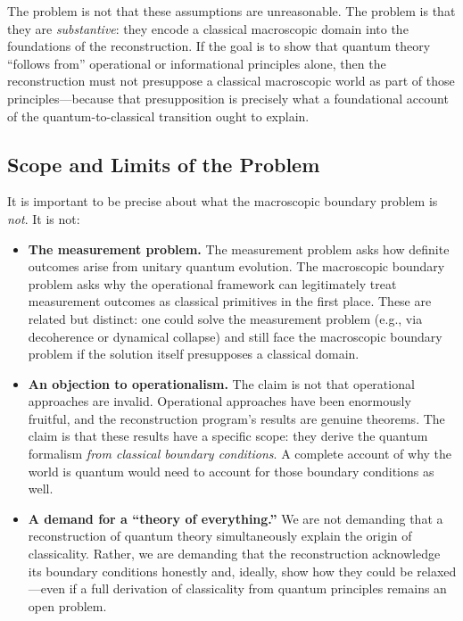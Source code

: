 \documentclass[12pt,a4paper,twoside]{article}
\begin{document}
The problem is not that these assumptions are unreasonable. The problem is that they are \emph{substantive}: they encode a classical macroscopic domain into the foundations of the reconstruction. If the goal is to show that quantum theory ``follows from'' operational or informational principles alone, then the reconstruction must not presuppose a classical macroscopic world as part of those principles---because that presupposition is precisely what a foundational account of the quantum-to-classical transition ought to explain.

\subsection{Scope and Limits of the Problem}

It is important to be precise about what the macroscopic boundary problem is \emph{not}. It is not:

\begin{itemize}
\item \textbf{The measurement problem.} The measurement problem asks how definite outcomes arise from unitary quantum evolution. The macroscopic boundary problem asks why the operational framework can legitimately treat measurement outcomes as classical primitives in the first place. These are related but distinct: one could solve the measurement problem (e.g., via decoherence or dynamical collapse) and still face the macroscopic boundary problem if the solution itself presupposes a classical domain.

\item \textbf{An objection to operationalism.} The claim is not that operational approaches are invalid. Operational approaches have been enormously fruitful, and the reconstruction program's results are genuine theorems. The claim is that these results have a specific scope: they derive the quantum formalism \emph{from classical boundary conditions}. A complete account of why the world is quantum would need to account for those boundary conditions as well.

\item \textbf{A demand for a ``theory of everything.''} We are not demanding that a reconstruction of quantum theory simultaneously explain the origin of classicality. Rather, we are demanding that the reconstruction acknowledge its boundary conditions honestly and, ideally, show how they could be relaxed---even if a full derivation of classicality from quantum principles remains an open problem.
\end{itemize}
\end{document}

